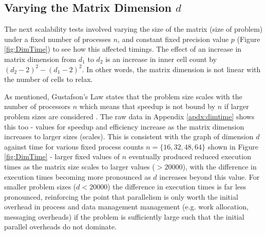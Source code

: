 \documentclass[11pt]{article}
\begin{document}
{\color{darkindigo}
\subsection{Varying the Matrix Dimension $d$}}
The next scalability tests involved varying the size of the matrix (size of problem) under a fixed number of processes $n$, and constant fixed precision value $p$ (Figure \ref{fig:DimTime}) to see how this affected timings. The effect of an increase in matrix dimension from $d_1$ to $d_2$ is an increase in inner cell count by $(d_2-2)^2 - (d_1-2)^2$. In other words, the matrix dimension is not linear with the number of cells to relax.

As mentioned, Gustafson's Law states that the problem size scales with the number of processors $n$ which means that speedup is not bound by $n$ if larger problem sizes are considered \cite{gustafson1988}. The raw data in Appendix \ref{apdx:dimtime} shows this too - values for speedup and efficiency increase as the matrix dimension increases to larger sizes (scales). This is consistent with the graph of dimension $d$ against time for various fixed process counts $n=\{16,32,48,64\}$ shown in Figure \ref{fig:DimTime} - larger fixed values of $n$ eventually produced reduced execution times as the matrix size scales to larger values ($>20000$), with the difference in execution times becoming more pronounced as $d$ increases beyond this value.  For smaller problem sizes ($d<20000$) the difference in execution times is far less pronounced, reinforcing the point that parallelism is only worth the initial overhead in process and data management management (e.g. work allocation, messaging overheads) if the problem is sufficiently large such that the initial parallel overheads do not dominate.
\end{document}

